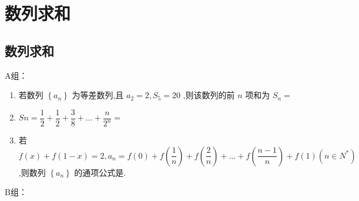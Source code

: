     


   

\section*{数列求和}
\subsection*{数列求和}
A组：
\begin{enumerate}
    \item 若数列 $ \left\{  {a}_{n}\right\} $ 为等差数列,且 $ {a}_{2} = 2,{S}_{5} = {20} $ ,则该数列的前 $ n $ 项和为 $ {S}_{n} = $ 
    \item $ {Sn} = \dfrac{1}{2} + \dfrac{1}{2} + \dfrac{3}{8} + \ldots  + \dfrac{n}{{2}^{n}} =  $ 
    \item 若 $ f\left( x\right)  + f\left( {1 - x}\right)  = 2,{a}_{n} = f\left( 0\right)  + f\left( \dfrac{1}{n}\right)  + f\left( \dfrac{2}{n}\right)  + \ldots  + f\left( \dfrac{n - 1}{n}\right)  + f\left( 1\right) \left( {n \in  {N}^{ * }}\right) $ ,则数列 $ \left\{  {a}_{n}\right\} $ 的通项公式是.

\end{enumerate}
B组：
